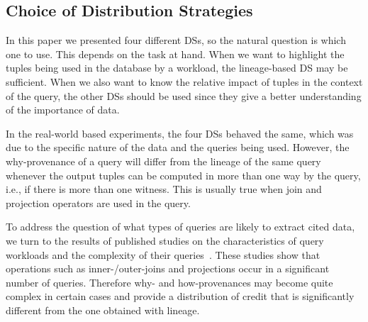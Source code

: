 \documentclass[preprint,12pt,sort&compress]{elsarticle}
\newcommand{\rone}[1]{\textcolor{reviewer1}{#1}}
\newcommand{\scream}[1]{{\bf * #1 *}{\typeout{#1}}}
\begin{document}
\subsection{Choice of Distribution Strategies}
\label{subsec: DSs}
\rone{In this paper we presented four different DSs, so the natural question is which one to use.  This depends on the task at hand.   When we want to highlight the tuples being used in the database by a workload, the lineage-based DS may be sufficient. When we also want to know the relative impact of tuples in the context of the query, the other DSs should be used since they give a better understanding of the importance of data.}

\rone{In the real-world based experiments, the four DSs behaved the same, which was due to the specific nature of the data and the queries being used. However, the why-provenance of a query will differ from the lineage of the same query whenever the output tuples can be computed in more than one way by the query, i.e., if there is more than one witness. This is usually true when join and projection operators are used in the query.
} 


\rone{To address the question of what types of queries are likely to extract cited data, we turn to the results of published studies on the characteristics of query workloads and the complexity of their queries~\cite{Vogelsgesang2018get,Remil2021makes,Jain2016sqlshare}.  
These studies show that operations such as inner-/outer-joins and projections occur in a significant number of queries.  Therefore why- and how-provenances may become quite complex in certain cases and provide a distribution of credit that is significantly different from the one obtained with lineage. }
\end{document}
